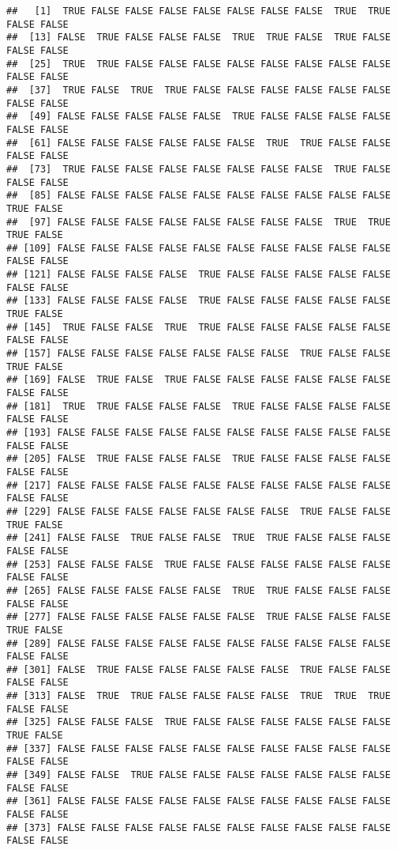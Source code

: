 \documentclass[
]{book}
\begin{document}
\begin{verbatim}
##   [1]  TRUE FALSE FALSE FALSE FALSE FALSE FALSE FALSE  TRUE  TRUE FALSE FALSE
##  [13] FALSE  TRUE FALSE FALSE FALSE  TRUE  TRUE FALSE  TRUE FALSE FALSE FALSE
##  [25]  TRUE  TRUE FALSE FALSE FALSE FALSE FALSE FALSE FALSE FALSE FALSE FALSE
##  [37]  TRUE FALSE  TRUE  TRUE FALSE FALSE FALSE FALSE FALSE FALSE FALSE FALSE
##  [49] FALSE FALSE FALSE FALSE FALSE  TRUE FALSE FALSE FALSE FALSE FALSE FALSE
##  [61] FALSE FALSE FALSE FALSE FALSE FALSE  TRUE  TRUE FALSE FALSE FALSE FALSE
##  [73]  TRUE FALSE FALSE FALSE FALSE FALSE FALSE FALSE  TRUE FALSE FALSE FALSE
##  [85] FALSE FALSE FALSE FALSE FALSE FALSE FALSE FALSE FALSE FALSE  TRUE FALSE
##  [97] FALSE FALSE FALSE FALSE FALSE FALSE FALSE FALSE  TRUE  TRUE  TRUE FALSE
## [109] FALSE FALSE FALSE FALSE FALSE FALSE FALSE FALSE FALSE FALSE FALSE FALSE
## [121] FALSE FALSE FALSE FALSE  TRUE FALSE FALSE FALSE FALSE FALSE FALSE FALSE
## [133] FALSE FALSE FALSE FALSE  TRUE FALSE FALSE FALSE FALSE FALSE  TRUE FALSE
## [145]  TRUE FALSE FALSE  TRUE  TRUE FALSE FALSE FALSE FALSE FALSE FALSE FALSE
## [157] FALSE FALSE FALSE FALSE FALSE FALSE FALSE  TRUE FALSE FALSE  TRUE FALSE
## [169] FALSE  TRUE FALSE  TRUE FALSE FALSE FALSE FALSE FALSE FALSE FALSE FALSE
## [181]  TRUE  TRUE FALSE FALSE FALSE  TRUE FALSE FALSE FALSE FALSE FALSE FALSE
## [193] FALSE FALSE FALSE FALSE FALSE FALSE FALSE FALSE FALSE FALSE FALSE FALSE
## [205] FALSE  TRUE FALSE FALSE FALSE  TRUE FALSE FALSE FALSE FALSE FALSE FALSE
## [217] FALSE FALSE FALSE FALSE FALSE FALSE FALSE FALSE FALSE FALSE FALSE FALSE
## [229] FALSE FALSE FALSE FALSE FALSE FALSE FALSE  TRUE FALSE FALSE  TRUE FALSE
## [241] FALSE FALSE  TRUE FALSE FALSE  TRUE  TRUE FALSE FALSE FALSE FALSE FALSE
## [253] FALSE FALSE FALSE  TRUE FALSE FALSE FALSE FALSE FALSE FALSE FALSE FALSE
## [265] FALSE FALSE FALSE FALSE FALSE  TRUE  TRUE FALSE FALSE FALSE FALSE FALSE
## [277] FALSE FALSE FALSE FALSE FALSE FALSE  TRUE FALSE FALSE FALSE  TRUE FALSE
## [289] FALSE FALSE FALSE FALSE FALSE FALSE FALSE FALSE FALSE FALSE FALSE FALSE
## [301] FALSE  TRUE FALSE FALSE FALSE FALSE FALSE  TRUE FALSE FALSE FALSE FALSE
## [313] FALSE  TRUE  TRUE FALSE FALSE FALSE FALSE  TRUE  TRUE  TRUE FALSE FALSE
## [325] FALSE FALSE FALSE  TRUE FALSE FALSE FALSE FALSE FALSE FALSE  TRUE FALSE
## [337] FALSE FALSE FALSE FALSE FALSE FALSE FALSE FALSE FALSE FALSE FALSE FALSE
## [349] FALSE FALSE  TRUE FALSE FALSE FALSE FALSE FALSE FALSE FALSE FALSE FALSE
## [361] FALSE FALSE FALSE FALSE FALSE FALSE FALSE FALSE FALSE FALSE FALSE FALSE
## [373] FALSE FALSE FALSE FALSE FALSE FALSE FALSE FALSE FALSE FALSE FALSE FALSE

\end{verbatim}
\end{document}

